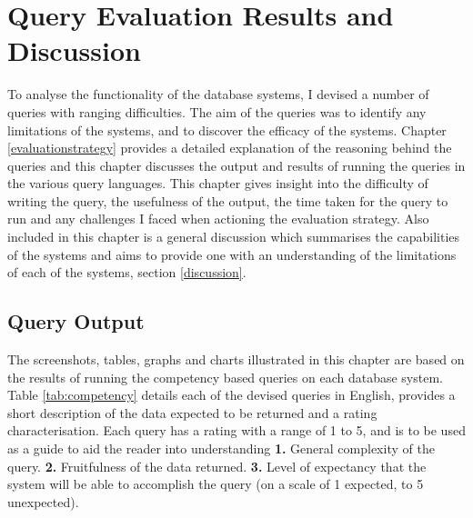 \chapter{Query Evaluation Results and Discussion}\label{results}
To analyse the functionality of the database systems, I devised a number of queries with ranging difficulties. The aim of the queries was to identify any limitations of the systems, and to discover the efficacy of the systems. Chapter \ref{evaluationstrategy} provides a detailed explanation of the reasoning behind the queries and this chapter discusses the output and results of running the queries in the various query languages. This chapter gives insight into the difficulty of writing the query, the usefulness of the output, the time taken for the query to run and any challenges I faced when actioning the evaluation strategy. Also included in this chapter is a general discussion which summarises the capabilities of the systems and aims to provide one with an understanding of the limitations of each of the systems, section  \ref{discussion}.

\section{Query Output}\label{output}
The screenshots, tables, graphs and charts illustrated in this chapter are based on the results of running the competency based queries on each database system. Table \ref{tab:competency} details each of the devised queries in English, provides a short description of the data expected to be returned and a rating characterisation. Each query has a rating with a range of 1 to 5, and is to be used as a guide to aid the reader into understanding \textbf{1.} General complexity of the query. \textbf{2.} Fruitfulness of the data returned. \textbf{3.} Level of expectancy that the system will be able to accomplish the query (on a scale of 1 expected, to 5 unexpected).

